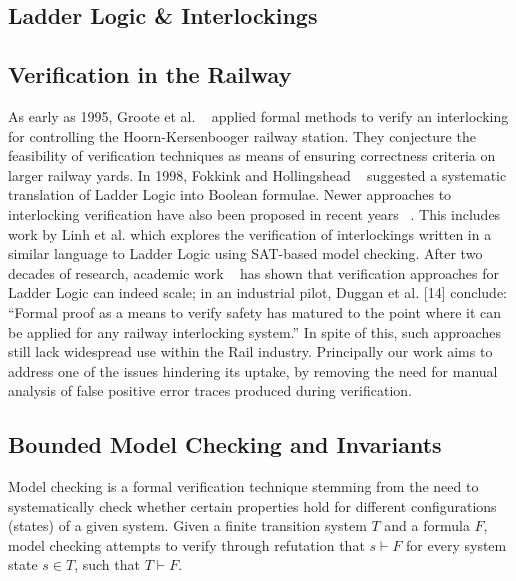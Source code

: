 \documentclass[conference,compsoc]{IEEEtran}
\begin{document}
\subsection{Ladder Logic \& Interlockings}

\subsection{Verification in the Railway}
As early as 1995, Groote
et al. ~\cite{groote1995safety} applied formal methods to verify an interlocking for controlling the Hoorn-Kersenbooger railway station. They conjecture the feasibility of verification techniques
as means of ensuring correctness criteria on larger railway yards. In 1998, Fokkink
and Hollingshead ~\cite{fokkink1998verification} suggested a systematic translation of Ladder Logic into Boolean
formulae. Newer approaches to interlocking verification have also been proposed in recent
years ~\cite{fantechi2012some, ferrari2011model, haxthausen2008modelling}. This includes work by Linh et al. which explores the verification
of interlockings written in a similar language to Ladder Logic using SAT-based model
checking. After two decades of research, academic work ~\cite{kanso2009automated, james2013verification} has shown that verification
approaches for Ladder Logic can indeed scale; in an industrial pilot, Duggan et al. [14] conclude: “Formal proof as a means to verify safety has matured to the point where it
can be applied for any railway interlocking system.” In spite of this, such approaches still lack widespread use within the Rail industry. Principally our work aims to address one of the issues hindering its uptake, by removing the need for manual analysis of false positive error traces produced during verification.

\subsection{Bounded Model Checking and Invariants}
Model checking is a formal verification technique stemming from the need to systematically
check whether certain properties hold for different configurations (states) of a given system.
Given a finite transition system $T$ and a formula $F$, model checking attempts to verify through refutation that $s \vdash F$ for every system state $s \in T$, such that $T \vdash F$. 
\end{document}
